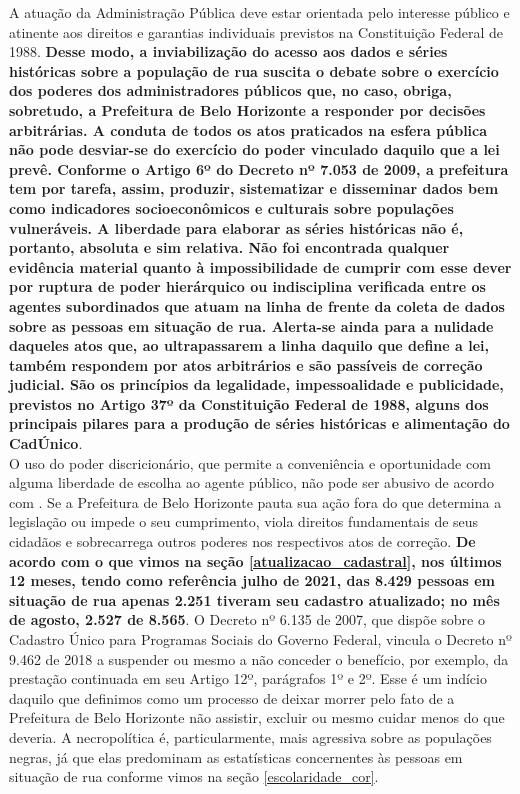 \documentclass[12pt]{article}
\begin{document}
A atuação da Administração Pública deve estar orientada pelo interesse público e atinente aos direitos e garantias individuais previstos na Constituição Federal de 1988. \textbf{Desse modo, a inviabilização do acesso aos dados e séries históricas sobre a população de rua suscita o debate sobre o exercício dos poderes dos administradores públicos que, no caso, obriga, sobretudo, a Prefeitura de Belo Horizonte a responder por decisões arbitrárias. A conduta de todos os atos praticados na esfera pública não pode desviar-se do exercício do poder vinculado daquilo que a lei prevê. Conforme o Artigo 6º do Decreto nº 7.053 de 2009, a prefeitura tem por tarefa, assim, produzir, sistematizar e disseminar dados bem como indicadores socioeconômicos e culturais sobre populações vulneráveis. A liberdade para elaborar as séries históricas não é, portanto, absoluta e sim relativa. Não foi encontrada qualquer evidência material quanto à impossibilidade de cumprir com esse dever por ruptura de poder hierárquico ou indisciplina verificada entre os agentes subordinados que atuam na linha de frente da coleta de dados sobre as pessoas em situação de rua. Alerta-se ainda para a nulidade daqueles atos que, ao ultrapassarem a linha daquilo que define a lei, também respondem por atos arbitrários e são passíveis de correção judicial. São os princípios da legalidade, impessoalidade e publicidade, previstos no Artigo 37º da Constituição Federal de 1988, alguns dos principais pilares para a produção de séries históricas e alimentação do CadÚnico}.\\

O uso do poder discricionário, que permite a conveniência e oportunidade com alguma liberdade de escolha ao agente público, não pode ser abusivo de acordo com \cite{arbit1, arbit2, arbit3}. Se a Prefeitura de Belo Horizonte pauta sua ação fora do que determina a legislação ou impede o seu cumprimento, viola direitos fundamentais de seus cidadãos e sobrecarrega outros poderes nos respectivos atos de correção. \textbf{De acordo com o que vimos na seção \ref{atualizacao_cadastral}, nos últimos 12 meses, tendo como referência julho de 2021, das 8.429 pessoas em situação de rua apenas 2.251 tiveram seu cadastro atualizado; no mês de agosto, 2.527 de 8.565}. O Decreto nº 6.135 de 2007, que dispõe sobre o Cadastro Único para Programas Sociais do Governo Federal, vincula o Decreto nº 9.462 de 2018 a suspender ou mesmo a não conceder o benefício, por exemplo, da prestação continuada em seu Artigo 12º, parágrafos 1º e 2º. Esse é um indício daquilo que definimos como um processo de deixar morrer pelo fato de a Prefeitura de Belo Horizonte não assistir, excluir ou mesmo cuidar menos do que deveria. A necropolítica é, particularmente, mais agressiva sobre as populações negras, já que elas predominam as estatísticas concernentes às pessoas em situação de rua conforme vimos na seção \ref{escolaridade_cor}.\\
\end{document}

